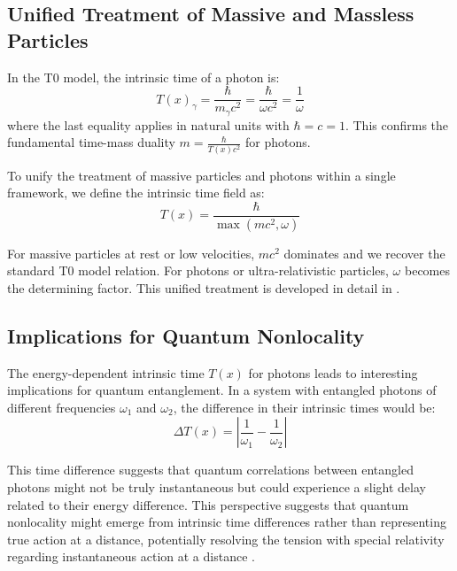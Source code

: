 \documentclass[12pt,a4paper]{article}
\newcommand{\Tfield}{T(x)}
\begin{document}
	\subsection{Unified Treatment of Massive and Massless Particles}
	\label{subsec:unified_treatment}
	
	In the T0 model, the intrinsic time of a photon is:
	\begin{equation}
		\Tfield_{\gamma} = \frac{\hbar}{m_{\gamma} c^2} = \frac{\hbar}{\omega c^2} = \frac{1}{\omega}
	\end{equation}
	where the last equality applies in natural units with \(\hbar = c = 1\). This confirms the fundamental time-mass duality \(m = \frac{\hbar}{\Tfield c^2}\) for photons.
	
	To unify the treatment of massive particles and photons within a single framework, we define the intrinsic time field as:
	\begin{equation}
		\Tfield = \frac{\hbar}{\max(m c^2, \omega)}
	\end{equation}
	
	For massive particles at rest or low velocities, \(m c^2\) dominates and we recover the standard T0 model relation. For photons or ultra-relativistic particles, \(\omega\) becomes the determining factor. This unified treatment is developed in detail in \cite{pascher_photons_2025}.
	
	\subsection{Implications for Quantum Nonlocality}
	\label{subsec:quantum_nonlocality}
	
	The energy-dependent intrinsic time \(\Tfield\) for photons leads to interesting implications for quantum entanglement. In a system with entangled photons of different frequencies \(\omega_1\) and \(\omega_2\), the difference in their intrinsic times would be:
	\begin{equation}
		\Delta \Tfield = \left|\frac{1}{\omega_1} - \frac{1}{\omega_2}\right|
	\end{equation}
	
	This time difference suggests that quantum correlations between entangled photons might not be truly instantaneous but could experience a slight delay related to their energy difference. This perspective suggests that quantum nonlocality might emerge from intrinsic time differences rather than representing true action at a distance, potentially resolving the tension with special relativity regarding instantaneous action at a distance \cite{pascher_photons_2025}.
	
\end{document}

